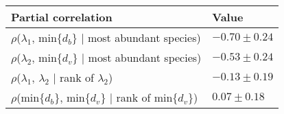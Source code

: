 \begin{table}[]
\begin{tabular}{ll}
\hline
Partial correlation                                         & Value            \\ \hline
$\rho$($\lambda_1$, min$\{d_b\}$ $|$ most abundant species) & $-0.70 \pm 0.24$ \\
$\rho$($\lambda_2$, min$\{d_v\}$ $|$ most abundant species) & $-0.53 \pm 0.24$ \\
$\rho$($\lambda_1$, $\lambda_2$ $|$ rank of $\lambda_2$)    & $-0.13 \pm 0.19$ \\
$\rho$(min$\{d_b\}$, min$\{d_v\}$ $|$ rank of min$\{d_v\}$) & $0.07 \pm 0.18$ \\ \hline
\end{tabular}
\end{table}